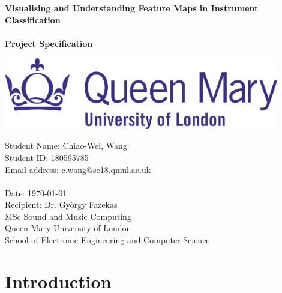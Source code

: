 \documentclass{article}
\begin{document}
\begin{titlepage}
    \centering
    \vfill
    {\bfseries\Huge
        Visualising and Understanding Feature Maps in Instrument Classification \\
        \hphantom\\
        Project Specification
    }    
  	\vfill

    \vfill
    \includegraphics[width=12cm]{queen-mary-logo.png} %
    \vfill
    \vfill
    {\bfseries\Large
    
        Student Name: Chiao-Wei, Wang
      \\Student ID: 180595785
      \\Email address: c.wang@se18.qmul.ac.uk
      \\ \hphantom
      \\Date: \today
      \\Recipient: Dr. Gy\"orgy Fazekas
      \\MSc Sound and Music Computing
      \\Queen Mary University of London
      \\School of Electronic Engineering and Computer Science


    }    
    \vfill
    \vfill
\end{titlepage}


\pagestyle{plain}
\section{Introduction}
\end{document}
